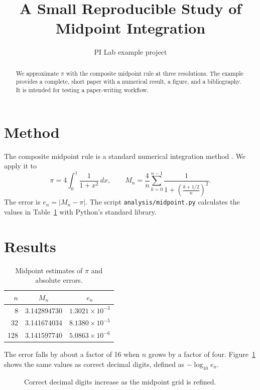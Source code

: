 \documentclass[11pt]{article}
\title{A Small Reproducible Study of Midpoint Integration}
\author{PI Lab example project}
\date{}
\begin{document}
\maketitle

\begin{abstract}
We approximate $\pi$ with the composite midpoint rule at three resolutions.
The example provides a complete, short paper with a numerical result, a figure,
and a bibliography. It is intended for testing a paper-writing workflow.
\end{abstract}

\section{Method}

The composite midpoint rule is a standard numerical integration method
\cite{atkinson1989}. We apply it to
\begin{equation}
  \pi = 4\int_0^1 \frac{1}{1+x^2}\,dx,
  \qquad
  M_n = \frac{4}{n}\sum_{k=0}^{n-1}
  \frac{1}{1+\left(\frac{k+1/2}{n}\right)^2}.
\end{equation}
The error is $e_n = |M_n-\pi|$. The script
\texttt{analysis/midpoint.py} calculates the values in Table~\ref{tab:results}
with Python's standard library.

\section{Results}

\begin{table}[h]
\centering
\begin{tabular}{rcc}
\hline
$n$ & $M_n$ & $e_n$ \\
\hline
8   & 3.142894730 & $1.3021\times 10^{-3}$ \\
32  & 3.141674034 & $8.1380\times 10^{-5}$ \\
128 & 3.141597740 & $5.0863\times 10^{-6}$ \\
\hline
\end{tabular}
\caption{Midpoint estimates of $\pi$ and absolute errors.}
\label{tab:results}
\end{table}

The error falls by about a factor of 16 when $n$ grows by a factor of four.
Figure~\ref{fig:convergence} shows the same values as correct decimal digits,
defined as $-\log_{10} e_n$.

\begin{figure}[h]
\centering

\caption{Correct decimal digits increase as the midpoint grid is refined.}
\label{fig:convergence}
\end{figure}
\end{document}
